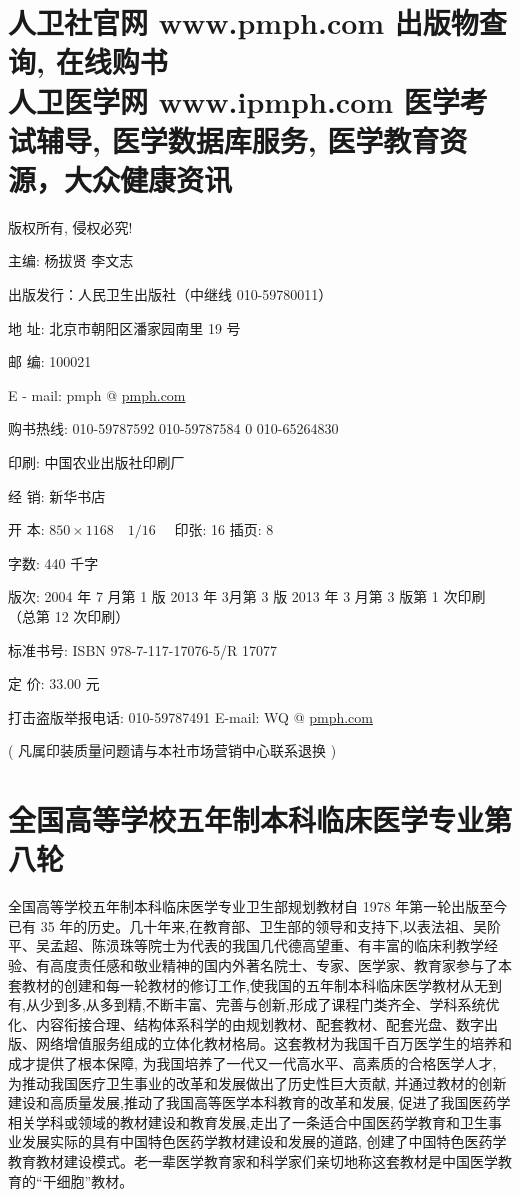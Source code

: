 \documentclass[10pt]{article}
\begin{document}
\section*{人卫社官网 www.pmph.com 出版物查询, 在线购书 \\
 人卫医学网 www.ipmph.com 医学考试辅导, 医学数据库服务, 医学教育资源，大众健康资讯}
版权所有, 侵权必究!

主编: 杨拔贤 李文志

出版发行：人民卫生出版社（中继线 010-59780011）

地 址: 北京市朝阳区潘家园南里 19 号

邮 编: 100021

E - mail: pmph @ \href{http://pmph.com}{pmph.com}

购书热线: 010-59787592 010-59787584 0 010-65264830

印刷: 中国农业出版社印刷厂

经 销: 新华书店

开 本: $850 \times 1168 \quad 1 / 16 \quad$ 印张: 16 插页: 8

字数: 440 千字

版次: 2004 年 7 月第 1 版 2013 年 3月第 3 版 2013 年 3 月第 3 版第 1 次印刷（总第 12 次印刷）

标准书号: ISBN 978-7-117-17076-5/R 17077

定 价: 33.00 元

打击盗版举报电话: 010-59787491 E-mail: WQ @ \href{http://pmph.com}{pmph.com}

( 凡属印装质量问题请与本社市场营销中心联系退换 )

\section*{全国高等学校五年制本科临床医学专业第八轮}
全国高等学校五年制本科临床医学专业卫生部规划教材自 1978 年第一轮出版至今已有 35 年的历史。几十年来,在教育部、卫生部的领导和支持下,以表法祖、吴阶平、吴孟超、陈涢珠等院士为代表的我国几代德高望重、有丰富的临床利教学经验、有高度责任感和敬业精神的国内外著名院士、专家、医学家、教育家参与了本套教材的创建和每一轮教材的修订工作,使我国的五年制本科临床医学教材从无到有,从少到多,从多到精,不断丰富、完善与创新,形成了课程门类齐全、学科系统优化、内容衔接合理、结构体系科学的由规划教材、配套教材、配套光盘、数字出版、网络增值服务组成的立体化教材格局。这套教材为我国千百万医学生的培养和成才提供了根本保障, 为我国培养了一代又一代高水平、高素质的合格医学人才, 为推动我国医疗卫生事业的改革和发展做出了历史性巨大贡献, 并通过教材的创新建设和高质量发展,推动了我国高等医学本科教育的改革和发展, 促进了我国医药学相关学科或领域的教材建设和教育发展,走出了一条适合中国医药学教育和卫生事业发展实际的具有中国特色医药学教材建设和发展的道路, 创建了中国特色医药学教育教材建设模式。老一辈医学教育家和科学家们亲切地称这套教材是中国医学教育的“干细胞”教材。
\end{document}
